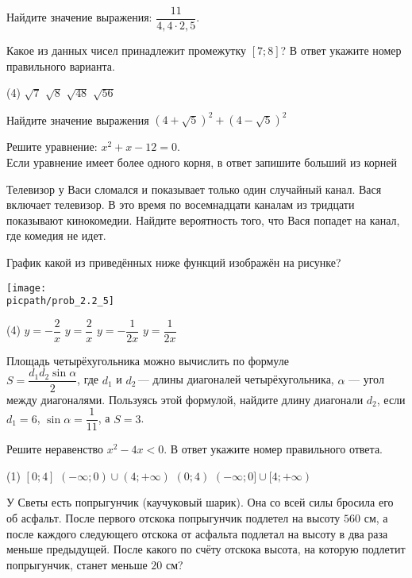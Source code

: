 \begin{training}[2]
\begin{listofex}
		\foranswer
		\item Найдите значение выражения: \( \dfrac{11}{4,4\cdot2,5} \).
		\foranswer
		\item Какое из данных чисел принадлежит промежутку \( [7;8] \)? В ответ укажите номер правильного варианта.
		\begin{tasks}(4)
			\task \( \sqrt{7} \)
			\task \( \sqrt{8} \)
			\task \( \sqrt{48} \)
			\task \( \sqrt{56} \)
		\end{tasks}
		\foranswer
		\item Найдите значение выражения \( (4+\sqrt{5})^2+(4-\sqrt{5})^2 \)
		\foranswer
		\newpage
		\item Решите уравнение: \(x^2+x-12=0\).\\
		Если уравнение имеет более одного корня, в ответ запишите больший из корней
		\foranswer
		\item Телевизор у Васи сломался и показывает только один случайный канал. Вася включает телевизор. В это время по восемнадцати каналам из тридцати показывают кинокомедии. Найдите вероятность того, что Вася попадет на канал, где комедия не идет.
		\foranswer
		\item График какой из приведённых ниже функций изображён на рисунке?
		\begin{center}
			\texttt{[image: \\picpath/prob\_2.2\_5]}
		\end{center}
		\begin{tasks}(4)
			\task \( y=-\dfrac{2}{x} \)
			\task \( y=\dfrac{2}{x} \)
			\task \( y=-\dfrac{1}{2x} \)
			\task \( y=\dfrac{1}{2x} \)
		\end{tasks}
		\foranswer
		\item Площадь четырёхугольника можно вычислить по формуле \\ \( S=\dfrac{d_1d_2\sin\alpha}{2} \),  где \( d_1 \) и \( d_2 \) --- длины диагоналей четырёхугольника, \( \alpha \) --- угол между диагоналями. Пользуясь этой формулой, найдите длину диагонали \( d_2 \), если \( d_1=6 \), \( \sin\alpha=\dfrac{1}{11} \), а \( S=3 \).
		\foranswer
		\item Решите неравенство \( x^2-4x<0 \). В ответ укажите номер правильного ответа.
		\begin{tasks}(1)
			\task \( [0;4] \)
			\task \( (-\infty;0)\cup(4;+\infty) \)
			\task \( (0;4) \)
			\task \( (-\infty;0]\cup[4;+\infty) \)
		\end{tasks}
		\foranswer
		\item У Светы есть попрыгунчик (каучуковый шарик). Она со всей силы бросила его об асфальт. После первого отскока попрыгунчик подлетел на высоту \( 560 \) см, а после каждого следующего отскока от асфальта подлетал на высоту в два раза меньше предыдущей. После какого по счёту отскока высота, на которую подлетит попрыгунчик, станет меньше \( 20 \) см?

\end{listofex}
\end{training}
